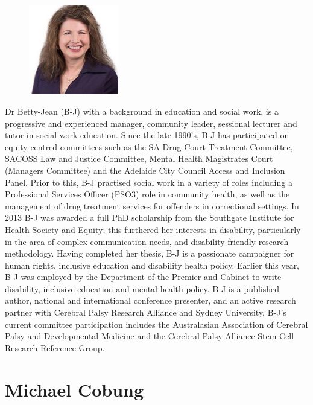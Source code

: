\documentclass[twoside,14pt,a4paper,notitlepage]{memoir}
\begin{document}
\begin{figure}
\centering
\includegraphics[width=0.35\textwidth]{betty_jean.jpg}
\end{figure}

Dr Betty-Jean (B-J) with a background in education and social work, is a progressive and experienced manager, community leader, sessional lecturer and tutor in social work education.  Since the late 1990’s, B-J has participated on equity-centred committees such as the SA Drug Court Treatment Committee, SACOSS Law and Justice Committee, Mental Health Magistrates Court (Managers Committee) and the Adelaide City Council Access and Inclusion Panel.  Prior to this, B-J practised social work in a variety of roles including a Professional Services Officer (PSO3) role in community health, as well as the management of drug treatment services for offenders in correctional settings. In 2013 B-J was awarded a full PhD scholarship from the Southgate Institute for Health Society and Equity; this furthered her interests in disability, particularly in the area of complex communication needs, and disability-friendly research methodology. Having completed her thesis, B-J is a passionate campaigner for human rights, inclusive education and disability health policy. Earlier this year, B-J was employed by the Department of the Premier and Cabinet to write disability, inclusive education and mental health policy.  B-J is a published author, national and international conference presenter, and an active research partner with Cerebral Palsy Research Alliance and Sydney University.  B-J’s current committee participation includes the Australasian Association of Cerebral Palsy and Developmental Medicine and the Cerebral Palsy Alliance Stem Cell Research Reference Group.
\vfill


\pagebreak
\vspace*{2cm}
\section*{Michael Cobung}
\end{document}
